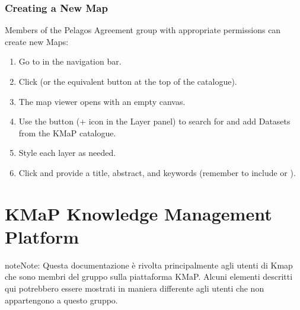 \documentclass[letterpaper,10pt,english]{sphinxmanual}
\begin{document}
\subsection{Creating a New Map}
\label{\detokenize{en/04_exploring_maps:creating-a-new-map}}
\sphinxAtStartPar
Members of the Pelagos Agreement group with appropriate permissions can create new Maps:
\begin{enumerate}
%
\item {} 
\sphinxAtStartPar
Go to  in the navigation bar.

\item {} 
\sphinxAtStartPar
Click  (or the equivalent button at the top of the catalogue).

\item {} 
\sphinxAtStartPar
The map viewer opens with an empty canvas.

\item {} 
\sphinxAtStartPar
Use the  button (+ icon in the Layer panel) to search for and add
Datasets from the KMaP catalogue.

\item {} 
\sphinxAtStartPar
Style each layer as needed.

\item {} 
\sphinxAtStartPar
Click  and provide a title, abstract, and keywords
(remember to include  or ).

\end{enumerate}

\sphinxstepscope


\chapter{KMaP \textendash{} Knowledge Management Platform}
\label{\detokenize{it/index:kmap-knowledge-management-platform}}\label{\detokenize{it/index::doc}}
\sphinxAtStartPar
{}

\begin{sphinxadmonition}{note}{Note:}
\sphinxAtStartPar
Questa documentazione è rivolta principalmente agli utenti di Kmap che sono membri del gruppo
 sulla piattaforma KMaP. Alcuni elementi descritti qui
potrebbero essere mostrati in maniera differente agli utenti che non appartengono a questo gruppo.
\end{sphinxadmonition}
\end{document}
